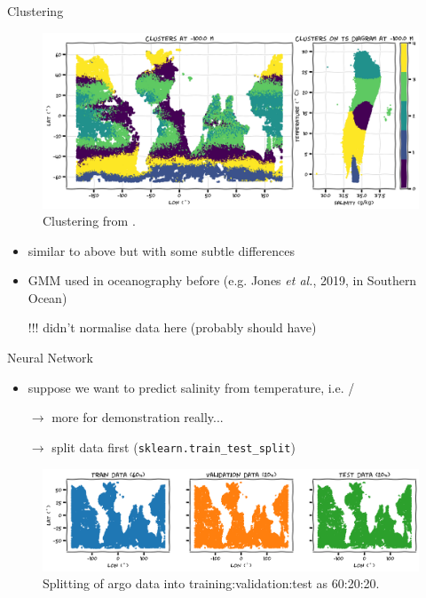 \documentclass[xcolor=x11names,compress]{beamer}
\renewcommand{\(}{\begin{columns}}
\renewcommand{\)}{\end{columns}}
\newcommand{\<}[1]{\begin{column}{#1}}
\renewcommand{\>}{\end{column}}
\begin{document}
\begin{frame}{Clustering}

\begin{figure}
  \includegraphics[width=\textwidth]{argo_data_GMM}
  \caption{Clustering from .}
\end{figure}

\begin{itemize}
  \item similar to above but with some subtle differences
  \item GMM used in oceanography before {\tiny (e.g. Jones \emph{et al.}, 2019,
  in Southern Ocean)}
  \item[]
  \item[!!!] didn't normalise data here {\tiny (probably should have)}
\end{itemize}

\end{frame}


\begin{frame}{Neural Network}

\begin{itemize}
  \item suppose we want to predict salinity from temperature, i.e.
  /
  \item[] $\to$ more for demonstration really...
  \item[] $\to$ split data first (\texttt{sklearn.train\_test\_split})
\end{itemize}

\begin{figure}
  \includegraphics[width=\textwidth]{argo_data_train}
  \caption{Splitting of argo data into training:validation:test as 60:20:20.}
\end{figure}

\end{frame}
\end{document}
